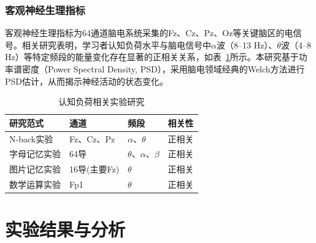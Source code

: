 \documentclass[runningheads]{llncs}
\begin{document}
\subsubsection{客观神经生理指标}
客观神经生理指标为64通道脑电系统采集的Fz、Cz、Pz、Oz等关键脑区的电信号。相关研究表明，学习者认知负荷水平与脑电信号中$\alpha$波（8–13 Hz）、$\theta$波（4–8 Hz）等特定频段的能量变化存在显著的正相关关系，如表~\ref{tab:1}所示。本研究基于功率谱密度（Power Spectral Density, PSD），采用脑电领域经典的Welch方法进行PSD估计，从而揭示神经活动的状态变化。


\begin{table}
  \centering
  \caption{认知负荷相关实验研究}
  \begin{tabular}{llll}
    \toprule
    研究范式 & 通道 & 频段 & 相关性                  \\
    \midrule
    N-back实验\cite{pergher2019mental} & Fz、Cz、Pz & $\alpha$、$\theta$ & 正相关\\
    字母记忆实验\cite{bashivan2015single} & 64导 & $\theta$、$\alpha$、$\beta$ & 正相关                    \\
    图片记忆实验\cite{zhang2016functional} & 16导(主要Fz) & $\theta$ & 正相关   \\
    数学运算实验\cite{so2017evaluation} & Fp1 & $\theta$ & 正相关  \\
    \bottomrule
  \end{tabular}
  \label{tab:1}
\end{table}

\section{实验结果与分析}
\end{document}
